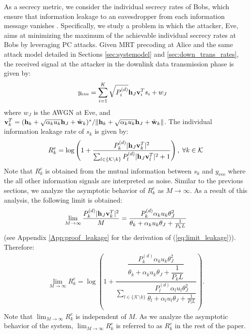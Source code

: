 \documentclass[draftclsnofoot, 12pt, onecolumn, journal]{IEEEtran}
\newcommand{\hv}{{\bf h}}
\newcommand{\wv}{{\bf w}}
\newcommand{\vv}{{\bf v}}
\begin{document}
As a secrecy metric, we consider the individual secrecy rates of Bobs, which ensure that information leakage to an eavesdropper from each information message vanishes \cite{akgun2017exploiting, chen2017individual}.
Specifically, we study a problem in which the attacker, Eve, aims at minimizing the maximum of the achievable individual secrecy rates at Bobs by leveraging PC attacks.
Given MRT precoding at Alice and the same attack model detailed in Sections \ref{sec:systemodel} and \ref{sec:down_trans_rates}, the received signal at the attacker in the downlink data transmission phase is given by:
%
\begin{align}
y_{\mathrm{eve}} & = \sum_{i=1}^K \sqrt{P_i^{(d)}} \hv_J \vv_i^T s_i + w_J 
\end{align}
%
where $w_J$ is the AWGN at Eve, and $\vv_k^T = (\hv_k + \sqrt{\alpha_k u_k} \hv_J + \tilde{\wv}_k)^* / \Vert \hv_k + \sqrt{\alpha_k u_k} \hv_J + \tilde{\wv}_k \Vert$.
The individual information leakage rate of $s_k$ is given by: 
%
\begin{align}
R_k^e = \log \left( 1 + \dfrac{ P_k^{(d)} \vert \hv_J \vv_k^T \vert^2 }{\sum_{l \in \{\mathcal{K} \setminus k \} } P_l^{(d)} \vert \hv_J \vv_l^T \vert^2 + 1} \right), \; \forall k \in \mathcal{K}
\end{align}
%
Note that $R_k^e$ is obtained from the mutual information between $s_k$ and $y_{\mathrm{eve}}$ where the all other information signals are interpreted as noise.
Similar to the previous sections, we analyze the asymptotic behavior of $R_k^e$ as $M \rightarrow \infty$.
As a result of this analysis, the following limit is obtained:
%
\begin{align}
\lim_{M \rightarrow \infty} \frac{ P_k^{(d)} \vert \hv_J \vv_k^T \vert^2} {M} = \dfrac{ P_k^{(d)} \alpha_k u_k \theta_J^2 }{\theta_k + \alpha_k u_k \theta_J + \frac{1}{P_k L}} 
\label{eq:limit_leakage}
\end{align}
%
(see Appendix \ref{App:proof_leakage} for the derivation of (\ref{eq:limit_leakage})).
Therefore:
%
\begin{align}
\lim_{M \rightarrow \infty} R_k^e = \log \left( 1 + \dfrac{ \dfrac{ P_k^{(d)} \alpha_k u_k \theta_J^2 }{\theta_k + \alpha_k u_k \theta_J + \dfrac{1}{P_k L}} }{\sum_{l \in \{\mathcal{K} \setminus k \} } \dfrac{ P_l^{(d)} \alpha_l u_l \theta_J^2 }{\theta_l + \alpha_l u_l \theta_J + \frac{1}{P_l L}} }  \right).
\end{align}
%
Note that $\lim_{M \rightarrow \infty} R_k^e $ is independent of $M$.
As we analyze the asymptotic behavior of the system, $\lim_{M \rightarrow \infty} R_k^e$ is referred to as $R_k^e$ in the rest of the paper.
\end{document}
